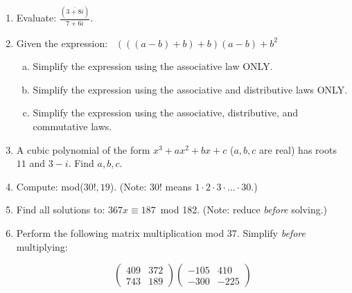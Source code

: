 
\begin{enumerate}[(1)]
\item
Evaluate:  $\displaystyle{\frac{ (\overline{3 + 8i}) }{7 + 6i}}$.
\item
Given the expression:~
 $(((a-b)+b)+b)(a-b) + b^2$
\begin{enumerate}[(a)]
\item
Simplify the expression using the associative law ONLY.
\item
Simplify the expression using the associative and distributive laws ONLY.
\item
Simplify the expression using the associative, distributive, and commutative laws.
\end{enumerate}
\item
A cubic polynomial of the form $x^3 + ax^2 + bx + c$  ($a,b,c$ are real)  has roots $11$ and $3-i$.  Find $a,b,c$.
\item
Compute:  mod($30!,19$).  (Note: $30!$ means $1 \cdot 2 \cdot 3 \cdot \ldots \cdot 30$.)
\item
Find all solutions to:
$367x  \equiv 187$~mod 182.  (Note:  reduce \emph{before} solving.)
\item
Perform the following matrix multiplication mod 37. Simplify \emph{before} multiplying:

$$\left(
\begin{array}{cc}
409 & 372 \\
743 & 189
\end{array}
\right)
\left(
\begin{array}{cc}
-105 & 410 \\
 -300& -225
\end{array}
\right)$$

\end{enumerate}

